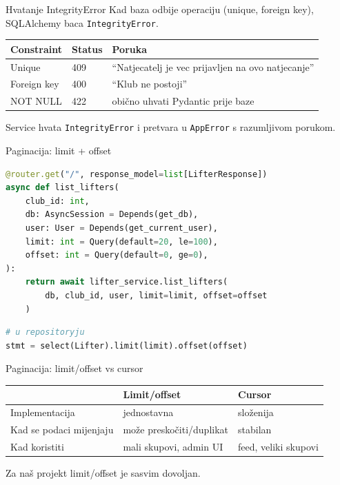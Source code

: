 \begin{frame}{Hvatanje IntegrityError}
Kad baza odbije operaciju (unique, foreign key), SQLAlchemy baca \texttt{IntegrityError}.

\vspace{0.6em}
\begin{tabular}{@{}llp{6cm}@{}}
  \toprule
  \textbf{Constraint} & \textbf{Status} & \textbf{Poruka} \\
  \midrule
  Unique & 409 & \enquote{Natjecatelj je vec prijavljen na ovo natjecanje} \\
  Foreign key & 400 & \enquote{Klub ne postoji} \\
  NOT NULL & 422 & obično uhvati Pydantic prije baze \\
  \bottomrule
\end{tabular}

\vspace{0.6em}
Service hvata \texttt{IntegrityError} i pretvara u \texttt{AppError} s razumljivom porukom.
\end{frame}

\begin{frame}[fragile,shrink=5]{Paginacija: limit + offset}
\begin{lstlisting}[language=python]
@router.get("/", response_model=list[LifterResponse])
async def list_lifters(
    club_id: int,
    db: AsyncSession = Depends(get_db),
    user: User = Depends(get_current_user),
    limit: int = Query(default=20, le=100),
    offset: int = Query(default=0, ge=0),
):
    return await lifter_service.list_lifters(
        db, club_id, user, limit=limit, offset=offset
    )
\end{lstlisting}

\vspace{0.4em}
\begin{lstlisting}[language=python]
# u repositoryju
stmt = select(Lifter).limit(limit).offset(offset)
\end{lstlisting}
\end{frame}

\begin{frame}{Paginacija: limit/offset vs cursor}
\begin{tabular}{@{}lp{5cm}p{5cm}@{}}
  \toprule
  & \textbf{Limit/offset} & \textbf{Cursor} \\
  \midrule
  Implementacija & jednostavna & složenija \\
  Kad se podaci mijenjaju & može preskočiti/duplikat & stabilan \\
  Kad koristiti & mali skupovi, admin UI & feed, veliki skupovi \\
  \bottomrule
\end{tabular}

\vspace{0.6em}
Za naš projekt limit/offset je sasvim dovoljan.
\end{frame}

